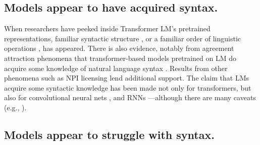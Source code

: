\documentclass[letterpaper, 12pt]{report}
\begin{document}
\subsection{Models appear to have acquired syntax.}

When researchers have peeked inside Transformer LM's pretrained representations, familiar syntactic structure \citep{hewitt-manning-2019-structural,jawahar-etal-2019-bert, lin-etal-2019-open, warstadt-bowman-2020-can, wu-etal-2020-perturbed}, or a familiar order of linguistic operations \citep{jawahar-etal-2019-bert,  tenney-etal-2019-bert}, has appeared. There is also evidence, notably from agreement attraction phenomena \citep{linzen-etal-2016-assessing} that transformer-based models pretrained on LM do acquire some knowledge of natural language syntax \citep{gulordava-etal-2018-colorless, chrupala-alishahi-2019-correlating,  jawahar-etal-2019-bert, lin-etal-2019-open, manning-etal-2020-emergent,  hawkins-etal-2020-investigating, linzen-baroni-2021-syntactic}. Results from other phenomena \citep{warstadt-bowman-2020-can} such as NPI licensing  \citep{warstadt-etal-2019-investigating} lend additional support. The claim that LMs acquire some syntactic knowledge has been made not only for transformers, but also for convolutional neural nets \citep{bernardy-lappin-2017-using}, and RNNs \citep{gulordava-etal-2018-colorless, van-schijndel-linzen-2018-neural, wilcox-etal-2018-rnn, zhang-bowman-2018-language, prasad-etal-2019-using, ravfogel-etal-2019-studying}---although there are many caveats (e.g., \citealt{ravfogel-etal-2018-lstm, white-etal-2018-lexicosyntactic,  davis-van-schijndel-2020-recurrent, chaves-2020-dont, da-costa-chaves-2020-assessing, kodner-gupta-2020-overestimation}).

\subsection{Models appear to struggle with syntax.}
\end{document}
